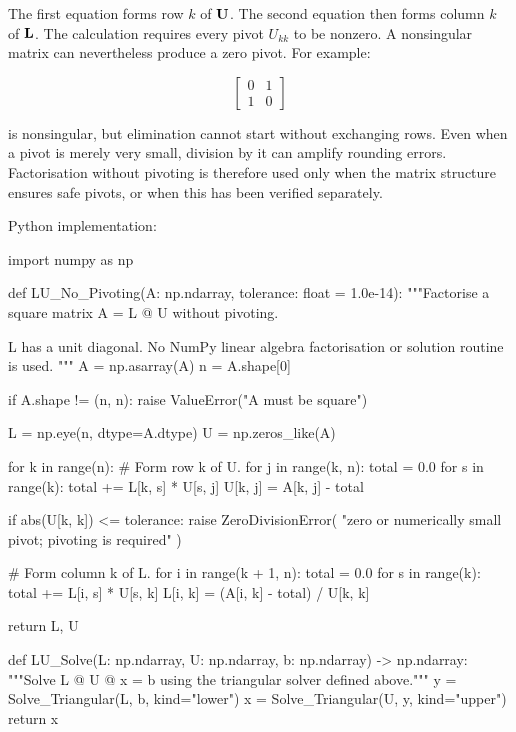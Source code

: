 The first equation forms row $ k $ of $ \mathbf{U} $. The second equation then forms
column $ k $ of $ \mathbf{L} $. The calculation requires every pivot $ U_{kk} $ to
be nonzero. A nonsingular matrix can nevertheless produce a zero pivot. For
example:

\begin{equation}
    \begin{bmatrix}
        0 & 1 \\
        1 & 0
    \end{bmatrix}
\end{equation}

is nonsingular, but elimination cannot start without exchanging rows. Even when
a pivot is merely very small, division by it can amplify rounding errors.
Factorisation without pivoting is therefore used only when the matrix structure
ensures safe pivots, or when this has been verified separately.

Python implementation:

\begin{python}
import numpy as np


def LU_No_Pivoting(A: np.ndarray,
                   tolerance: float = 1.0e-14):
    """Factorise a square matrix A = L @ U without pivoting.

    L has a unit diagonal. No NumPy linear algebra factorisation or
    solution routine is used.
    """
    A = np.asarray(A)
    n = A.shape[0]

    if A.shape != (n, n):
        raise ValueError("A must be square")

    L = np.eye(n, dtype=A.dtype)
    U = np.zeros_like(A)

    for k in range(n):
        # Form row k of U.
        for j in range(k, n):
            total = 0.0
            for s in range(k):
                total += L[k, s] * U[s, j]
            U[k, j] = A[k, j] - total

        if abs(U[k, k]) <= tolerance:
            raise ZeroDivisionError(
                "zero or numerically small pivot; pivoting is required"
            )

        # Form column k of L.
        for i in range(k + 1, n):
            total = 0.0
            for s in range(k):
                total += L[i, s] * U[s, k]
            L[i, k] = (A[i, k] - total) / U[k, k]

    return L, U


def LU_Solve(L: np.ndarray,
             U: np.ndarray,
             b: np.ndarray) -> np.ndarray:
    """Solve L @ U @ x = b using the triangular solver defined above."""
    y = Solve_Triangular(L, b, kind="lower")
    x = Solve_Triangular(U, y, kind="upper")
    return x
\end{python}

